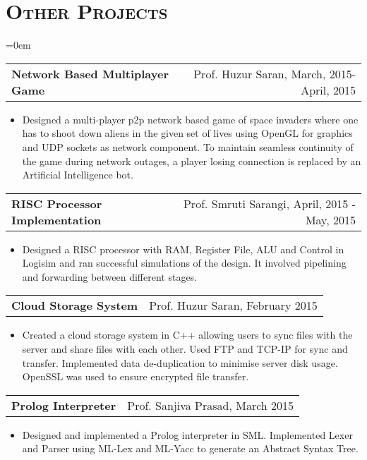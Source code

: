 \documentclass{article}
\makeatletter
\newenvironment{longversion}{}{} %
\newcommand{\headerrow}[2]
{\begin{tabular*}{\linewidth}{l@{\extracolsep{\fill}}r}
	#1 &
	#2 \\
\end{tabular*}}
\newcommand{\tmpsection}[1]{}
\let\tmpsection=\section
\renewcommand{\section}[1]{\tmpsection*{\textsc{#1}}}
\makeatother
\begin{document}
\begin{longversion}
\end{longversion}

\begin{longversion}
\section{Other Projects}
\begin{list} {}{\leftmargin=0em}
\setlength{\leftmargin}{0pt}

\item[]
  \headerrow {\textbf{Network Based Multiplayer Game}} {Prof. Huzur Saran, March, 2015- April, 2015}
  \begin{itemize} \item[]
  Designed a multi-player p2p network based game of space invaders where one has to shoot down aliens in the given set of lives using OpenGL for graphics and UDP sockets as network component. To maintain seamless continuity of the game during network outages, a player losing connection is replaced by an Artificial Intelligence bot. 
  \end{itemize}


\item[]
  \headerrow{ \textbf{RISC Processor Implementation}} {Prof. Smruti Sarangi, April, 2015 - May, 2015}
  \begin{itemize} \item[]
  Designed a RISC processor with RAM, Register File, ALU and Control in Logisim and ran successful simulations of the design. It involved pipelining and forwarding between different stages.
  \end{itemize}

\item[]
  \headerrow{ \textbf{Cloud Storage System}} {Prof. Huzur Saran, February 2015}
  \begin{itemize} \item[]
  Created a cloud storage system in C++ allowing users to sync files with the server and share files with each other. Used FTP and TCP-IP for sync and transfer. Implemented data de-duplication to minimise server disk usage. OpenSSL was used to ensure encrypted file transfer.
  \end{itemize}

\item[]
  \headerrow{ \textbf{Prolog Interpreter}} {Prof. Sanjiva Prasad, March 2015}
  \begin{itemize} \item[]
  Designed and implemented a Prolog interpreter in SML. Implemented Lexer and Parser using ML-Lex and ML-Yacc to generate an Abstract Syntax Tree.
  \end{itemize}

\end{list}

\end{longversion}
\end{document}
